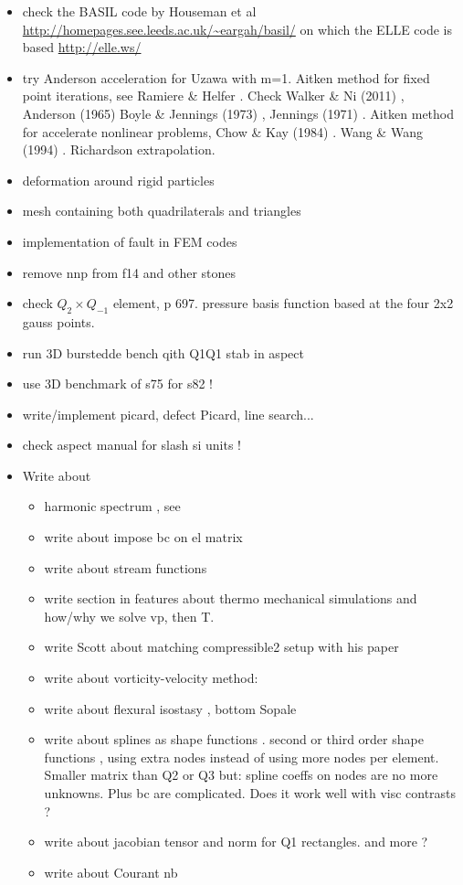 \begin{itemize}
\item check the BASIL code by Houseman et al \url{http://homepages.see.leeds.ac.uk/~eargah/basil/}
on which the ELLE code is based \url{http://elle.ws/} 
\item try Anderson acceleration for Uzawa \cite{hoow17} with m=1. Aitken method for 
fixed point iterations, see Ramiere \& Helfer \cite{rahe15}.
Check Walker \& Ni (2011) \cite{wani11}, Anderson (1965) \cite{ande65}
Boyle \& Jennings (1973) \cite{boje73}, Jennings (1971) \cite{jenn71}.
Aitken method for accelerate nonlinear problems, Chow \& Kay (1984) \cite{chka84}.
Wang \& Wang (1994) \cite{wawa94}. Richardson extrapolation. 
\item deformation around rigid particles \cite{ilma93}
\item mesh containing both quadrilaterals and triangles \cite{anbr80}
\item implementation of fault in FEM codes \cite{zhgu94,zhgu95}
\item remove nnp from f14 and other stones
\item check $Q_2 \times Q_{-1}$ element, \cite{grsa} p 697. pressure basis function based at the four 2x2 gauss points.
\item run 3D burstedde bench qith Q1Q1 stab in aspect
\item use 3D benchmark of s75 for s82 !
\item write/implement picard, defect Picard, line search...
\item check aspect manual for slash si units !
\item Write about

  \begin{itemize}
  \item harmonic spectrum , see \cite{ribr99}
  \item write about impose bc on el matrix
  \item write about stream functions 
  \item write section in features about thermo mechanical simulations and how/why we solve vp, then T.
  \item write Scott about matching compressible2 setup with his paper
  \item write about vorticity-velocity method: \cite{gats91,gust93,dehu95,ergq99,amct04,spez87}
  \item write about flexural isostasy \cite{maie12}, bottom Sopale
  \item write about splines as shape functions \cite{chri92}. second or third order shape functions , using extra nodes instead of using more nodes per element. 
  Smaller matrix than Q2 or Q3 but: spline coeffs on nodes are no more unknowns. Plus bc are complicated. Does it work well with visc contrasts ?
  \item write about jacobian tensor and norm for Q1 rectangles. and more ?
  \item write about Courant nb
  \end{itemize}
\end{itemize}

